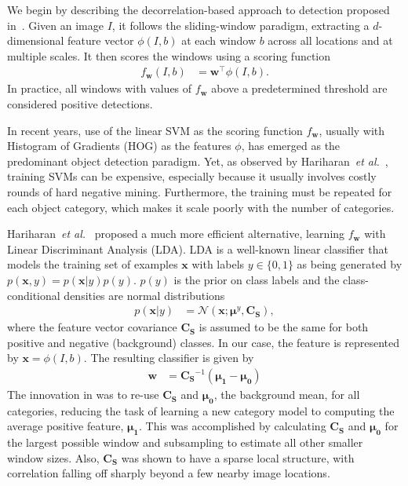 \documentclass[graybox]{svmult}
\newcommand{\xSrc}{\vec{x}}
\newcommand{\ySrc}{y}
\newcommand{\wSrc}{\vec{w}}
\newcommand\mat[1]{\mathbf{#1}}
\renewcommand\vec[1]{\mathbf{#1}}
\newcommand\etal{\textit{et al.}}
\newcommand{\muPosSrc}{\mathbf{\mu_{1}}}
\newcommand{\muNegSrc}{\vec{\mu_{0}}}
\newcommand{\sigSrc}{\mat{C_S}}
\begin{document}
We begin by describing the decorrelation-based approach to detection proposed in~\cite{who}. Given an image $I$, it follows the sliding-window paradigm, extracting a $d$-dimensional feature vector $\phi(I,b)$ at each window $b$ across all locations and at multiple scales. 
It then scores the windows using a scoring function 
\begin{align}
      \label{chap4_eq:score}
         f_{\wSrc}(I,b) &=  \wSrc^{\top}  \phi(I,b). 
      \end{align}
In practice, all windows with values of $f_{\vec{w}}$ above a predetermined threshold are considered positive detections.

In recent years, use of the linear SVM as the scoring function $f_{\wSrc}$, usually with Histogram of Gradients (HOG) as the features $\phi$, has emerged as the predominant object detection paradigm. Yet, as observed by Hariharan~\etal~\cite{who}, training SVMs can be expensive, especially because it usually involves costly rounds of hard negative mining. Furthermore, the training must be repeated for each object category, which makes it scale poorly with the number of categories.

Hariharan~\etal~\cite{who} proposed a much more efficient alternative, learning $f_{\wSrc}$ with Linear Discriminant Analysis (LDA). LDA is a well-known linear classifier that models the training set of examples $\xSrc$ with labels $\ySrc \in\{0,1\}$ as being generated by $p(\xSrc,\ySrc)=p(\xSrc|\ySrc)p(\ySrc)$. $p(\ySrc)$ is the prior on class labels and the class-conditional densities are normal distributions 
\begin{align}
      \label{eq:lda1}
         p(\xSrc|\ySrc) &= \mathcal{N}(\xSrc; {\vec{\mu}}^{\ySrc}, \sigSrc),
      \end{align}
where the feature vector covariance $\sigSrc$ is assumed to be the same for both positive and negative (background) classes. In our case, the feature is represented by $\xSrc = \phi(I,b)$. The resulting classifier is given by
\vspace{-0.1in}
\begin{align}
      \label{eq:lda2}
         \wSrc &= {\sigSrc}^{-1} ( \muPosSrc - \muNegSrc)
      \end{align}
The innovation in \cite{who} was to re-use $\sigSrc$ and $\muNegSrc$, the background mean, for all categories, reducing the task of learning a new category model to computing the average positive feature, $\muPosSrc$. This was accomplished by calculating $\sigSrc$ and $\muNegSrc$ for the largest possible window and subsampling to estimate all other smaller window sizes. Also, $\sigSrc$ was shown to have a sparse local structure, with correlation falling off sharply beyond a few nearby image locations.
\end{document}
